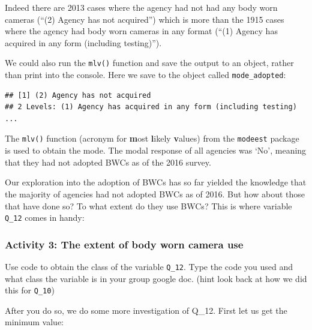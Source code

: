 \documentclass[
]{book}
\newenvironment{Shaded}{\begin{snugshade}}{\end{snugshade}}
\newcommand{\AttributeTok}[1]{\textcolor[rgb]{0.77,0.63,0.00}{#1}}
\newcommand{\ConstantTok}[1]{\textcolor[rgb]{0.00,0.00,0.00}{#1}}
\newcommand{\FunctionTok}[1]{\textcolor[rgb]{0.00,0.00,0.00}{#1}}
\newcommand{\NormalTok}[1]{#1}
\newcommand{\OtherTok}[1]{\textcolor[rgb]{0.56,0.35,0.01}{#1}}
\newcommand{\SpecialCharTok}[1]{\textcolor[rgb]{0.00,0.00,0.00}{#1}}
\begin{document}
Indeed there are 2013 cases where the agency had not had any body worn cameras (``(2) Agency has not acquired'') which is more than the 1915 cases where the agency had body worn cameras in any format (``(1) Agency has acquired in any form (including testing)'').

We could also run the \texttt{mlv()} function and save the output to an object, rather than print into the console. Here we save to the object called \texttt{mode\_adopted}:

\begin{Shaded}
\end{Shaded}

\begin{verbatim}
## [1] (2) Agency has not acquired
## 2 Levels: (1) Agency has acquired in any form (including testing) ...
\end{verbatim}

The \texttt{mlv()} function (acronym for \textbf{m}ost \textbf{l}ikely \textbf{v}alues) from the \texttt{modeest} package is used to obtain the mode. The modal response of all agencies was `No', meaning that they had not adopted BWCs as of the 2016 survey.

Our exploration into the adoption of BWCs has so far yielded the knowledge that the majority of agencies had not adopted BWCs as of 2016. But how about those that have done so? To what extent do they use BWCs? This is where variable \texttt{Q\_12} comes in handy:

\hypertarget{activity-3-the-extent-of-body-worn-camera-use}{%
\subsubsection{Activity 3: The extent of body worn camera use}\label{activity-3-the-extent-of-body-worn-camera-use}}

Use code to obtain the class of the variable \texttt{Q\_12}. Type the code you used and what class the variable is in your group google doc. (hint look back at how we did this for \texttt{Q\_10})

After you do so, we do some more investigation of Q\_12. First let us get the minimum value:

\begin{Shaded}
\end{Shaded}
\end{document}
